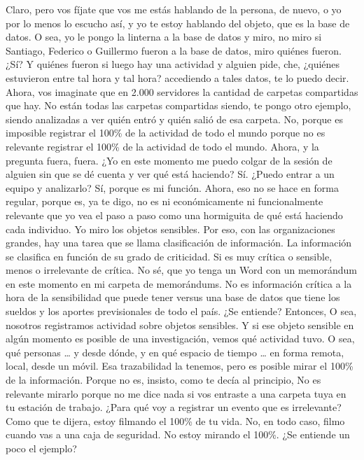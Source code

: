 \begin{description}[leftmargin=0cm, labelsep=0.5cm]
    \item[\textbf{PITA GUILLERMO:}] Claro, pero vos fíjate que vos me estás hablando de la persona, de nuevo, o yo por lo menos lo escucho así, y yo te estoy hablando del objeto, que es la base de datos. O sea, yo le pongo la linterna a la base de datos y miro, no miro si Santiago, Federico o Guillermo fueron a la base de datos, miro quiénes fueron. ¿Sí? Y quiénes fueron si luego hay una actividad y alguien pide, che, ¿quiénes estuvieron entre tal hora y tal hora? accediendo a tales datos, te lo puedo decir. Ahora, vos imaginate que en 2.000 servidores la cantidad de carpetas compartidas que hay. No están todas las carpetas compartidas siendo, te pongo otro ejemplo, siendo analizadas a ver quién entró y quién salió de esa carpeta. No, porque es imposible registrar el 100\% de la actividad de todo el mundo porque no es relevante registrar el 100\% de la actividad de todo el mundo. Ahora, y la pregunta fuera, fuera. ¿Yo en este momento me puedo colgar de la sesión de alguien sin que se dé cuenta y ver qué está haciendo? Sí. ¿Puedo entrar a un equipo y analizarlo? Sí, porque es mi función. Ahora, eso no se hace en forma regular, porque es, ya te digo, no es ni económicamente ni funcionalmente relevante que yo vea el paso a paso como una hormiguita de qué está haciendo cada individuo. Yo miro los objetos sensibles. Por eso, con las organizaciones grandes, hay una tarea que se llama clasificación de información. La información se clasifica en función de su grado de criticidad. Si es muy crítica o sensible, menos o irrelevante de crítica. No sé, que yo tenga un Word con un memorándum en este momento en mi carpeta de memorándums. No es información crítica a la hora de la sensibilidad que puede tener versus una base de datos que tiene los sueldos y los aportes previsionales de todo el país. ¿Se entiende? Entonces, O sea, nosotros registramos actividad sobre objetos sensibles. Y si ese objeto sensible en algún momento es posible de una investigación, vemos qué actividad tuvo. O sea, qué personas … y desde dónde, y en qué espacio de tiempo … en forma remota, local, desde un móvil. Esa trazabilidad la tenemos, pero es posible mirar el 100\% de la información. Porque no es, insisto, como te decía al principio, No es relevante mirarlo porque no me dice nada si vos entraste a una carpeta tuya en tu estación de trabajo. ¿Para qué voy a registrar un evento que es irrelevante? Como que te dijera, estoy filmando el 100\% de tu vida. No, en todo caso, filmo cuando vas a una caja de seguridad. No estoy mirando el 100\%. ¿Se entiende un poco el ejemplo?


\end{description}
